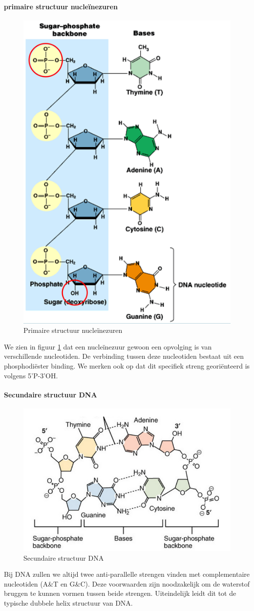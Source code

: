 \documentclass[a4paper,kul]{kulakarticle} %
\begin{document}
\paragraph{primaire structuur nucleïnezuren}
\begin{figure}[h]
	\centering
	\includegraphics[width=0.6\linewidth]{PrimaireStructuurDNA}
	\caption[Primaire structuur DNA]{Primaire structuur nucleïnezuren}
	\label{fig:primairestructuurdna}
\end{figure}
We zien in figuur \ref{fig:primairestructuurdna} dat een nucleïnezuur gewoon een opvolging is van verschillende nucleotiden. De verbinding tussen deze nucleotiden bestaat uit een phosphodiëster binding. We merken ook op dat dit specifiek streng georiënteerd is volgens 5'P-3'OH. 
\newpage
\paragraph{Secundaire structuur DNA}
\begin{figure}[h]
	\centering
	\includegraphics[width=0.5\linewidth]{SecundaireStructuurDNA}
	\caption[Secundaire structuur DNA]{Secundaire structuur DNA}
	\label{fig:secundairestructuurdna}
\end{figure}
Bij DNA zullen we altijd twee anti-parallelle strengen vinden met complementaire nucleotiden (A\&T en G\&C). Deze voorwaarden zijn noodzakelijk om de waterstof bruggen te kunnen vormen tussen beide strengen. Uiteindelijk leidt dit tot de typische dubbele helix structuur van DNA. 
\end{document}
